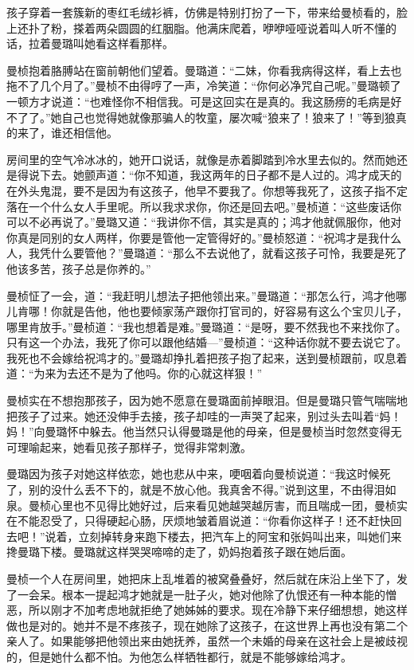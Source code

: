 \par 孩子穿着一套簇新的枣红毛绒衫裤，仿佛是特别打扮了一下，带来给曼桢看的，脸上还扑了粉，搽着两朵圆圆的红胭脂。他满床爬着，咿咿哑哑说着叫人听不懂的话，拉着曼璐叫她看这样看那样。
\par 曼桢抱着胳膊站在窗前朝他们望着。曼璐道：“二妹，你看我病得这样，看上去也拖不了几个月了。”曼桢不由得哼了一声，冷笑道：“你何必净咒自己呢。”曼璐顿了一顿方才说道：“也难怪你不相信我。可是这回实在是真的。我这肠痨的毛病是好不了了。”她自己也觉得她就像那骗人的牧童，屡次喊“狼来了！狼来了！”等到狼真的来了，谁还相信他。
\par 房间里的空气冷冰冰的，她开口说话，就像是赤着脚踏到冷水里去似的。然而她还是得说下去。她颤声道：“你不知道，我这两年的日子都不是人过的。鸿才成天的在外头鬼混，要不是因为有这孩子，他早不要我了。你想等我死了，这孩子指不定落在一个什么女人手里呢。所以我求求你，你还是回去吧。”曼桢道：“这些废话你可以不必再说了。”曼璐又道：“我讲你不信，其实是真的；鸿才他就佩服你，他对你真是同别的女人两样，你要是管他一定管得好的。”曼桢怒道：“祝鸿才是我什么人，我凭什么要管他？”曼璐道：“那么不去说他了，就看这孩子可怜，我要是死了他该多苦，孩子总是你养的。”
\par 曼桢怔了一会，道：“我赶明儿想法子把他领出来。”曼璐道：“那怎么行，鸿才他哪儿肯哪！你就是告他，他也要倾家荡产跟你打官司的，好容易有这么个宝贝儿子，哪里肯放手。”曼桢道：“我也想着是难。”曼璐道：“是呀，要不然我也不来找你了。只有这一个办法，我死了你可以跟他结婚—”曼桢道：“这种话你就不要去说它了。我死也不会嫁给祝鸿才的。”曼璐却挣扎着把孩子抱了起来，送到曼桢跟前，叹息着道：“为来为去还不是为了他吗。你的心就这样狠！”
\par 曼桢实在不想抱那孩子，因为她不愿意在曼璐面前掉眼泪。但是曼璐只管气喘喘地把孩子了过来。她还没伸手去接，孩子却哇的一声哭了起来，别过头去叫着“妈！妈！”向曼璐怀中躲去。他当然只认得曼璐是他的母亲，但是曼桢当时忽然变得无可理喻起来，她看见孩子那样子，觉得非常刺激。
\par 曼璐因为孩子对她这样依恋，她也悲从中来，哽咽着向曼桢说道：“我这时候死了，别的没什么丢不下的，就是不放心他。我真舍不得。”说到这里，不由得泪如泉。曼桢心里也不见得比她好过，后来看见她越哭越厉害，而且喘成一团，曼桢实在不能忍受了，只得硬起心肠，厌烦地皱着眉说道：“你看你这样子！还不赶快回去吧！”说着，立刻掉转身来跑下楼去，把汽车上的阿宝和张妈叫出来，叫她们来搀曼璐下楼。曼璐就这样哭哭啼啼的走了，奶妈抱着孩子跟在她后面。
\par 曼桢一个人在房间里，她把床上乱堆着的被窝叠叠好，然后就在床沿上坐下了，发了一会呆。根本一提起鸿才她就是一肚子火，她对他除了仇恨还有一种本能的憎恶，所以刚才不加考虑地就拒绝了她姊姊的要求。现在冷静下来仔细想想，她这样做也是对的。她并不是不疼孩子，现在她除了这孩子，在这世界上再也没有第二个亲人了。如果能够把他领出来由她抚养，虽然一个未婚的母亲在这社会上是被歧视的，但是她什么都不怕。为他怎么样牺牲都行，就是不能够嫁给鸿才。
